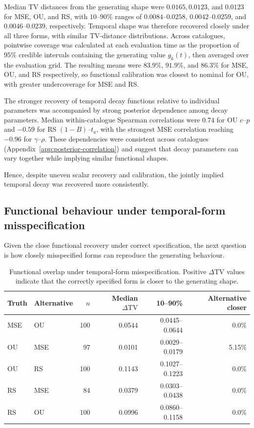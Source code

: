 \documentclass{statsmsc}
\begin{document}
Median TV distances from the generating shape were $0.0165, 0.0123$, and $0.0123$ for MSE, OU, and RS, with $10$--$90$\% ranges of $0.0084$--$0.0258$, $0.0042$--$0.0259$, and $0.0046$--$0.0239$, respectively. Temporal shape was therefore recovered closely under all three forms, with similar TV-distance distributions. Across catalogues, pointwise coverage was calculated at each evaluation time as the proportion of $95\%$ credible intervals containing the generating value $g_k(t)$, then averaged over the evaluation grid. The resulting means were $83.9\%$, $91.9\%$, and $86.3\%$ for MSE, OU, and RS respectively, so functional calibration was closest to nominal for OU, with greater undercoverage for MSE and RS.

The stronger recovery of temporal decay functions relative to individual parameters was accompanied by strong posterior dependence among decay parameters. Median within-catalogue Spearman correlations were $0.74$ for OU $c$--$p$ and $-0.59$ for RS $(1-B)$--$t_a$, with the strongest MSE correlation reaching $-0.96$ for $\gamma$--$\rho$. These dependencies were consistent across catalogues (Appendix~\ref{app:posterior-correlation}) and suggest that decay parameters can vary together while implying similar functional shapes. 

Hence, despite uneven scalar recovery and calibration, the jointly implied temporal decay was recovered more consistently.

\subsection{Functional behaviour under temporal-form misspecification} \label{sec:misspecification}
Given the close functional recovery under correct specification, the next question is how closely misspecified forms can reproduce the generating behaviour. 

\begin{table} [t]
\centering
\caption{Functional overlap under temporal-form misspecification. Positive $\Delta \mathrm{TV}$ values indicate that the correctly specified form is closer to the generating shape.}
\label{tab:misspec-tv} 
\begin{tabular}{llrrrr} 
\hline
Truth & Alternative & $n$ & Median $\Delta \mathrm{TV}$ & 10--90\% & Alternative closer \\
\hline
MSE & OU  & 100 & 0.0544 & 0.0445--0.0644   & 0.0\% \\
OU  & MSE & 97  & 0.0101 & 0.0029--0.0179 & 5.15\% \\
OU  & RS  & 100 & 0.1143 & 0.1027--0.1223   & 0.0\% \\
RS  & MSE & 84  & 0.0379 & 0.0303--0.0438   & 0.0\% \\
RS  & OU  & 100 & 0.0996 & 0.0860--0.1158   & 0.0\% \\
\hline
\end{tabular}
\end{table}
\end{document}
